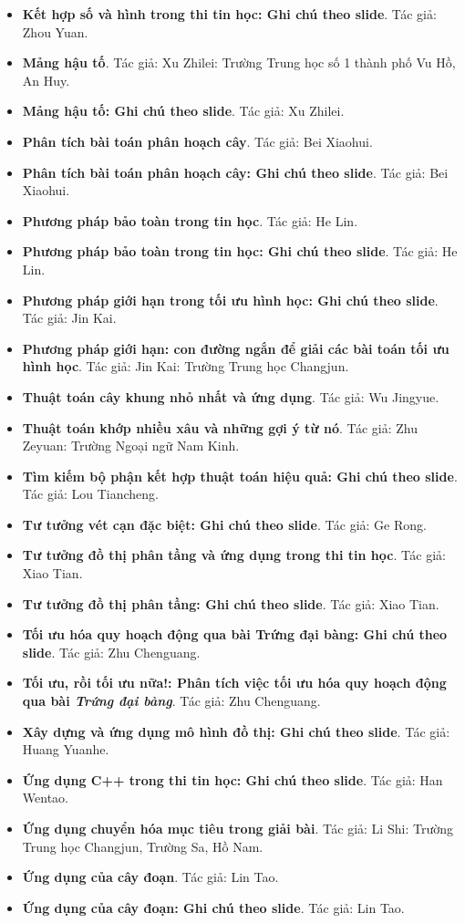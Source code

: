\documentclass[11pt]{article}
\begin{document}
\begin{itemize}[leftmargin=2em]
  \item \textbf{Kết hợp số và hình trong thi tin học: Ghi chú theo slide}. Tác giả: Zhou Yuan.
  \item \textbf{Mảng hậu tố}. Tác giả: Xu Zhilei: Trường Trung học số 1 thành phố Vu Hồ, An Huy.
  \item \textbf{Mảng hậu tố: Ghi chú theo slide}. Tác giả: Xu Zhilei.
  \item \textbf{Phân tích bài toán phân hoạch cây}. Tác giả: Bei Xiaohui.
  \item \textbf{Phân tích bài toán phân hoạch cây: Ghi chú theo slide}. Tác giả: Bei Xiaohui.
  \item \textbf{Phương pháp bảo toàn trong tin học}. Tác giả: He Lin.
  \item \textbf{Phương pháp bảo toàn trong tin học: Ghi chú theo slide}. Tác giả: He Lin.
  \item \textbf{Phương pháp giới hạn trong tối ưu hình học: Ghi chú theo slide}. Tác giả: Jin Kai.
  \item \textbf{Phương pháp giới hạn: con đường ngắn để giải các bài toán tối ưu hình học}. Tác giả: Jin Kai: Trường Trung học Changjun.
  \item \textbf{Thuật toán cây khung nhỏ nhất và ứng dụng}. Tác giả: Wu Jingyue.
  \item \textbf{Thuật toán khớp nhiều xâu và những gợi ý từ nó}. Tác giả: Zhu Zeyuan: Trường Ngoại ngữ Nam Kinh.
  \item \textbf{Tìm kiếm bộ phận kết hợp thuật toán hiệu quả: Ghi chú theo slide}. Tác giả: Lou Tiancheng.
  \item \textbf{Tư tưởng vét cạn đặc biệt: Ghi chú theo slide}. Tác giả: Ge Rong.
  \item \textbf{Tư tưởng đồ thị phân tầng và ứng dụng trong thi tin học}. Tác giả: Xiao Tian.
  \item \textbf{Tư tưởng đồ thị phân tầng: Ghi chú theo slide}. Tác giả: Xiao Tian.
  \item \textbf{Tối ưu hóa quy hoạch động qua bài Trứng đại bàng: Ghi chú theo slide}. Tác giả: Zhu Chenguang.
  \item \textbf{Tối ưu, rồi tối ưu nữa!: Phân tích việc tối ưu hóa quy hoạch động qua bài \emph{Trứng đại bàng}}. Tác giả: Zhu Chenguang.
  \item \textbf{Xây dựng và ứng dụng mô hình đồ thị: Ghi chú theo slide}. Tác giả: Huang Yuanhe.
  \item \textbf{Ứng dụng C++ trong thi tin học: Ghi chú theo slide}. Tác giả: Han Wentao.
  \item \textbf{Ứng dụng chuyển hóa mục tiêu trong giải bài}. Tác giả: Li Shi: Trường Trung học Changjun, Trường Sa, Hồ Nam.
  \item \textbf{Ứng dụng của cây đoạn}. Tác giả: Lin Tao.
  \item \textbf{Ứng dụng của cây đoạn: Ghi chú theo slide}. Tác giả: Lin Tao.
\end{itemize}
\end{document}

